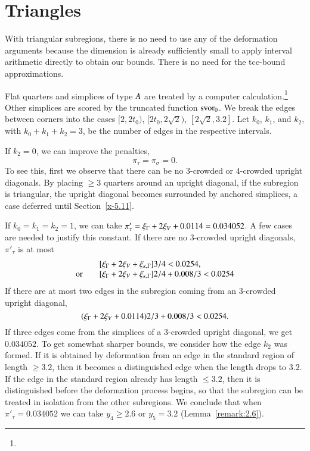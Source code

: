 \section{Triangles} %

With triangular subregions, there is no need to use any of the
deformation arguments because the dimension is already sufficiently
small to apply interval arithmetic directly to obtain our bounds.
There is no need for the tcc-bound approximations.

Flat quarters and simplices of type $A$ are treated by a computer
calculation.\footnote{} %
Other simplices are scored by the truncated function
$\operatorname{svor}_0$. We break the edges between corners into the cases
    $[2,2t_0)$, $[2t_0,2\sqrt{2})$, $[2\sqrt{2},3.2]$.
Let $k_0$, $k_1$, and $k_2$, with $k_0+k_1+k_2=3$, be the number
of edges  in the respective intervals.

If $k_2=0$, we can improve the penalties,
    $$\pi_\tau = \pi_\sigma=0.$$
To see this, first we observe that there can be no $3$-crowded or
$4$-crowded upright diagonals. By placing $\ge3$ quarters around
an upright diagonal, if the subregion is triangular, the upright
diagonal becomes surrounded by anchored simplices, a case deferred
until Section~\ref{x-5.11}.

If $k_0=k_1=k_2=1$, we can take $\pi'_\tau=
\xi_\Gamma+2\xi_V+0.0114=0.034052$. A few cases are needed to justify
this constant. If there are no $3$-crowded upright diagonals,
$\pi'_\tau$ is at most
    $$
    \begin{array}{lll}
    &[\xi_\Gamma + 2 \xi_V +\xi_{\kappa,\Gamma} ]3/4 < 0.0254,\\
    \hbox{or\quad }&[\xi_\Gamma+2\xi_V+\xi_{\kappa,\Gamma}]2/4 + 0.008/3 < 0.0254
    \end{array}
    $$
If there are at most two edges in the subregion coming from an
$3$-crowded upright diagonal,
    $$(\xi_\Gamma+2\xi_V+0.0114)2/3 + 0.008/3 < 0.0254.$$
If three edges come from the simplices of a $3$-crowded upright
diagonal, we get $0.034052$. To get somewhat sharper bounds, we
consider how the edge $k_2$ was formed.  If it is obtained by
deformation from an edge in the standard region of length
$\ge3.2$, then it becomes a distinguished edge when the length
drops to $3.2$.  If the edge in the standard region already has
length $\le3.2$, then it is distinguished before the deformation
process begins, so that the subregion can be treated in isolation
from the other subregions. We conclude that when
$\pi'_\tau=0.034052$ we can take $y_4\ge2.6$ or $y_5=3.2$
(Lemma~\ref{remark:2.6}).

